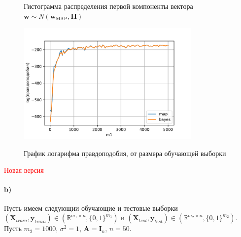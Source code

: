 \documentclass[12pt, twoside]{article}
\begin{document}
\begin{figure}[h!]\center
{}
\caption{Гистограмма распределения первой компоненты вектора $\textbf{w}\sim N(\textbf{w}_{\text{MAP}}, \textbf{H})$}
\label{Task1_3_4}
\end{figure}

\begin{figure}[h!]\center
{\includegraphics[width=0.8\textwidth]{Task1_2}}
\caption{График логарифма правдоподобия, от размера обучающей выборки}
\label{Task1_2}
\end{figure}

{\Large \textcolor{red}{Новая версия}}

\paragraph{b)} Пусть имеем следующии обучающие и тестовые выборки $(\textbf{X}_{train}, \textbf{y}_{train}) \in (\mathbb{R}^{m_1\times n}, \{0,1\}^{m_1})$ и $(\textbf{X}_{test}, \textbf{y}_{test}) \in (\mathbb{R}^{m_2\times n}, \{0,1\}^{m_2})$. Пусть $m_2=1000$, $\sigma^2 =1$, $\textbf{A} = \textbf{I}_n$, $n = 50$.
\end{document}

